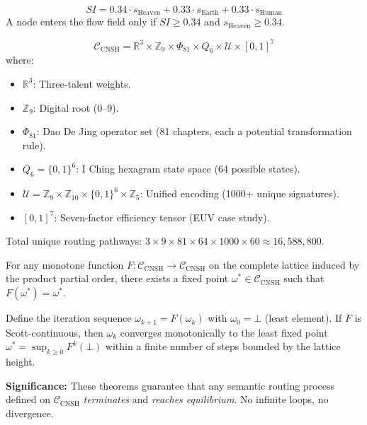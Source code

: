 \documentclass[twocolumn]{article}
\begin{document}
\begin{definition}
\[
SI = 0.34 \cdot s_{\text{Heaven}} + 0.33 \cdot s_{\text{Earth}} + 0.33 \cdot s_{\text{Human}}
\]
A node enters the flow field only if $SI \geq 0.34$ and $s_{\text{Heaven}} \geq 0.34$.
\end{definition}

\begin{definition}
\[
\mathcal{C}_{\text{CNSH}} = \mathbb{R}^3 \times \mathbb{Z}_9 \times \Phi_{81} \times Q_6 \times \mathcal{U} \times [0,1]^7
\]
where:
\begin{itemize}
  \item $\mathbb{R}^3$: Three-talent weights.
  \item $\mathbb{Z}_9$: Digital root (0–9).
  \item $\Phi_{81}$: Dao De Jing operator set (81 chapters, each a potential transformation rule).
  \item $Q_6 = \{0,1\}^6$: I Ching hexagram state space (64 possible states).
  \item $\mathcal{U} = \mathbb{Z}_9 \times \mathbb{Z}_{10} \times \{0,1\}^6 \times \mathbb{Z}_5$: Unified encoding (1000+ unique signatures).
  \item $[0,1]^7$: Seven-factor efficiency tensor (EUV case study).
\end{itemize}

Total unique routing pathways: $3 \times 9 \times 81 \times 64 \times 1000 \times 60 \approx 16{,}588{,}800$.
\end{definition}

\begin{theorem}
\label{thm:kt}
For any monotone function $F: \mathcal{C}_{\text{CNSH}} \to \mathcal{C}_{\text{CNSH}}$ on the complete lattice induced by the product partial order, there exists a fixed point $\omega^* \in \mathcal{C}_{\text{CNSH}}$ such that $F(\omega^*) = \omega^*$.
\end{theorem}

\begin{theorem}
\label{thm:kleene}
Define the iteration sequence $\omega_{k+1} = F(\omega_k)$ with $\omega_0 = \bot$ (least element). If $F$ is Scott-continuous, then $\omega_k$ converges monotonically to the least fixed point $\omega^* = \sup_{k \geq 0} F^k(\bot)$ within a finite number of steps bounded by the lattice height.
\end{theorem}

\textbf{Significance:} These theorems guarantee that any semantic routing process defined on $\mathcal{C}_{\text{CNSH}}$ \emph{terminates} and \emph{reaches equilibrium}. No infinite loops, no divergence.
\end{document}
